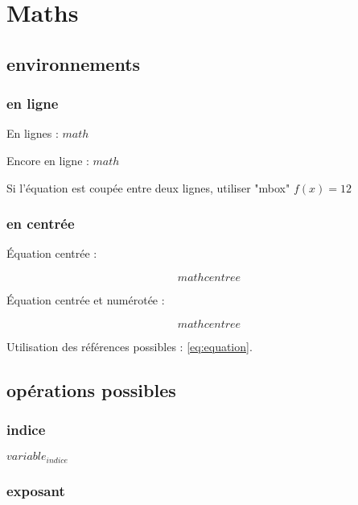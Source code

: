 

\section{Maths}

\subsection{environnements}

\subsubsection{en ligne}

En lignes : $math$

Encore en ligne : 
\begin{math}
	math
\end{math}


Si l'équation est coupée entre deux lignes, utiliser "mbox" \mbox{$f(x)=12$}


\subsubsection{en centrée}

Équation centrée : 

\begin{displaymath}
	math centree
\end{displaymath}


Équation centrée et numérotée :

\begin{equation}
	\label{eq:equation}
	math centree
\end{equation}


Utilisation des références possibles : \ref{eq:equation}.


\subsection{opérations possibles}

\subsubsection{indice}

$variable_{indice}$

\subsubsection{exposant}


